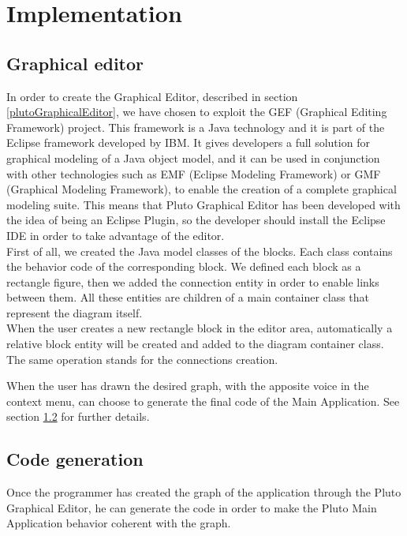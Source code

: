 \chapter{Implementation}
\label{cap5}



\section{Graphical editor}\label{editor}

In order to create the Graphical Editor, described in section \ref{plutoGraphicalEditor}, we have chosen to exploit the GEF (Graphical Editing Framework) project. This framework is a Java technology and it is part of the Eclipse framework developed by IBM.
It gives developers a full solution for graphical modeling of a Java object model, and it can be used in conjunction with other technologies such as EMF (Eclipse Modeling Framework) or GMF (Graphical Modeling Framework), to enable the creation of a complete graphical modeling suite. This means that Pluto Graphical Editor has been developed with the idea of being an Eclipse Plugin, so the developer should install the Eclipse IDE in order to take advantage of the editor.
\\

First of all, we created the Java model classes of the blocks. Each class contains the behavior code of the corresponding block.
We defined each block as a rectangle figure, then we added the connection entity in order to enable links between them. All these entities are children of a main container class that represent the diagram itself.
\\

When the user creates a new rectangle block in the editor area, automatically a relative block entity will be created and added to the diagram container class. The same operation stands for the connections creation.

When the user has drawn the desired graph, with the apposite voice in the context menu, can choose to generate the final code of the Main Application. See section \ref{codeGeneration} for further details.
\\

\section{Code generation}\label{codeGeneration}

Once the programmer has created the graph of the application through the Pluto Graphical Editor, he can generate the code in order to make the Pluto Main Application behavior coherent with the graph.

